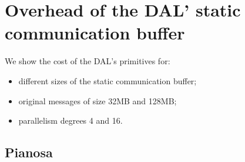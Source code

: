 \section{Overhead of the DAL' static communication buffer}
\label{appendixB}
We show the cost of the DAL's primitives for:
\begin{itemize}
\item different sizes of the static communication buffer;
\item original messages of size 32MB and 128MB;
\item parallelism degrees 4 and 16.
\end{itemize} 

\subsection*{Pianosa}

